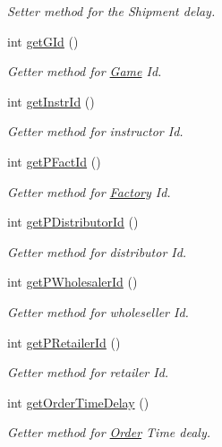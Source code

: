 \begin{DoxyCompactItemize}
\begin{DoxyCompactList}\small\item\em Setter method for the Shipment delay. \end{DoxyCompactList}\item 
int \hyperlink{class_game_aea578dd12fcdf404231a14ecc18fb98a}{get\+G\+Id} ()
\begin{DoxyCompactList}\small\item\em Getter method for \hyperlink{class_game}{Game} Id. \end{DoxyCompactList}\item 
int \hyperlink{class_game_a52dd61290996a492087b81464eba52c8}{get\+Instr\+Id} ()
\begin{DoxyCompactList}\small\item\em Getter method for instructor Id. \end{DoxyCompactList}\item 
int \hyperlink{class_game_a9d4b2445fa34422a03d99edba54c0c28}{get\+P\+Fact\+Id} ()
\begin{DoxyCompactList}\small\item\em Getter method for \hyperlink{class_factory}{Factory} Id. \end{DoxyCompactList}\item 
int \hyperlink{class_game_ab59b422a861f1aa2d59c176b9b57ed80}{get\+P\+Distributor\+Id} ()
\begin{DoxyCompactList}\small\item\em Getter method for distributor Id. \end{DoxyCompactList}\item 
int \hyperlink{class_game_a7a93d4a8c499ee090efd397fc068a3c4}{get\+P\+Wholesaler\+Id} ()
\begin{DoxyCompactList}\small\item\em Getter method for wholeseller Id. \end{DoxyCompactList}\item 
int \hyperlink{class_game_ac8cb0ad6c01ecddc3c76bb0bdbc9202b}{get\+P\+Retailer\+Id} ()
\begin{DoxyCompactList}\small\item\em Getter method for retailer Id. \end{DoxyCompactList}\item 
int \hyperlink{class_game_a61aed9159fe6130486be8034f3e28086}{get\+Order\+Time\+Delay} ()
\begin{DoxyCompactList}\small\item\em Getter method for \hyperlink{class_order}{Order} Time dealy. \end{DoxyCompactList}\item 

\end{DoxyCompactItemize}
